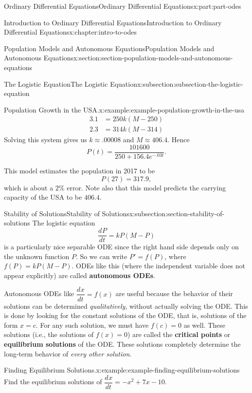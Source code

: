 \documentclass[twoside,10pt,]{book}
\newcommand{\terminology}[1]{\textbf{#1}}
\numberwithin{equation}{part}
\providecommand{\dv}[3][]{\dfrac{d^{#1} #2}{d #3^{#1}}}
\begin{document}
\begin{partptx}{Ordinary Differential Equations}{}{Ordinary Differential Equations}{}{}{x:part:part-odes}
\begin{chapterptx}{Introduction to Ordinary Differential Equations}{}{Introduction to Ordinary Differential Equations}{}{}{x:chapter:intro-to-odes}
\begin{sectionptx}{Population Models and Autonomous Equations}{}{Population Models and Autonomous Equations}{}{}{x:section:section-population-models-and-autonomous-equations}
\begin{subsectionptx}{The Logistic Equation}{}{The Logistic Equation}{}{}{x:subsection:subsection-the-logistic-equation}
\begin{example}{Population Growth in the USA.}{x:example:example-population-growth-in-the-usa}
\begin{align*}
3.1 & = 250k(M - 250) \\
2.3 & = 314k(M - 314) 
\end{align*}
Solving this system gives us \(k\approx.00008\) and \(M \approx 406.4\). Hence%
\begin{equation*}
P(t) = \frac{101600}{250 + 156.4e^{-.03t}}.
\end{equation*}
%
\par
This model estimates the population in 2017 to be%
\begin{equation*}
P(27) = 317.9,
\end{equation*}
which is about a \(2\%\) error. Note also that this model predicts the carrying capacity of the USA to be \(406.4\).%
\end{example}
\end{subsectionptx}
%
%
\typeout{************************************************}
\typeout{************************************************}
%
\begin{subsectionptx}{Stability of Solutions}{}{Stability of Solutions}{}{}{x:subsection:section-stability-of-solutions}
The logistic equation%
\begin{equation*}
\dv{P}{t} = kP(M-P)
\end{equation*}
is a particularly nice separable ODE since the right hand side depends only on the unknown function \(P\). So we can write \(P' = f(P)\), where \(f(P) = kP(M-P)\). ODEs like this (where the independent variable does not appear explicitly) are called \terminology{autonomous ODEs}.%
\par
Autonomous ODEs like \(\dv{x}{t} = f(x)\) are useful because the behavior of their solutions can be determined \emph{qualitatively}, without actually solving the ODE. This is done by looking for the constant solutions of the ODE, that is, solutions of the form \(x = c\). For any such solution, we must have \(f(c) = 0\) as well. These solutions (i.e., the solutions of \(f(x) = 0\)) are called the \terminology{critical points} or \terminology{equilibrium solutions} of the ODE. These solutions completely determine the long-term behavior of \emph{every other solution}.%
\begin{example}{Finding Equilibrium Solutions.}{x:example:example-finding-equilibrium-solutions}%
Find the equilibrium solutions of \(\dv{x}{t} = -x^{2} + 7x - 10\).%
\par\smallskip%

\end{example}
\end{subsectionptx}
\end{sectionptx}
\end{chapterptx}
\end{partptx}
\end{document}
